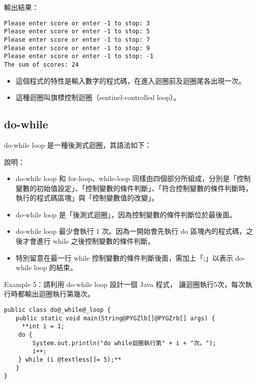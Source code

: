 \documentclass[a4paper,12pt,english]{sphinxmanual}
\begin{document}
輸出結果：

\begin{Verbatim}[commandchars=@\[\]]
Please enter score or enter -1 to stop: 3
Please enter score or enter -1 to stop: 5
Please enter score or enter -1 to stop: 7
Please enter score or enter -1 to stop: 9
Please enter score or enter -1 to stop: -1
The sum of scores: 24
\end{Verbatim}
\begin{itemize}
\item {} 
這個程式的特性是輸入數字的程式碼，在進入迴圈前及迴圈尾各出現一次。

\item {} 
這種迴圈叫旗標控制迴圈（sentinel-controlled loop）。

\end{itemize}


\subsection{do-while}
\label{java_loop:do-while}
do-while loop 是一種後測式迴圈，其語法如下：

說明：
\begin{itemize}
\item {} 
do-while loop 和 for-loop、while-loop 同樣由四個部分所組成，分別是「控制變數的初始值設定」、「控制變數的條件判斷」、「符合控制變數的條件判斷時，執行的程式碼區塊」與「控制變數值的改變」。

\item {} 
do-while loop 是「後測式迴圈」，因為控制變數的條件判斷位於最後面。

\item {} 
do-while loop 最少會執行 1 次。因為一開始會先執行 do 區塊內的程式碼，之後才會進行 while 之後控制變數的條件判斷。

\item {} 
特別留意在最一行 while 控制變數的條件判斷後面，需加上「;」以表示 do-while loop 的結束。

\end{itemize}

Example 5：請利用 do-while loop 設計一個 Java 程式，
讓迴圈執行5次，每次執行時都輸出迴圈執行第幾次。

\begin{Verbatim}[commandchars=@\[\]]
public class do@_while@_loop {
　　public static void main(String@PYGZlb[]@PYGZrb[] args) {
     **int i = 1;
    do {
        System.out.println("do while迴圈執行第" + i + "次。");
        i++;
    } while (i @textless[]= 5);**
　　}
}
\end{Verbatim}
\end{document}
